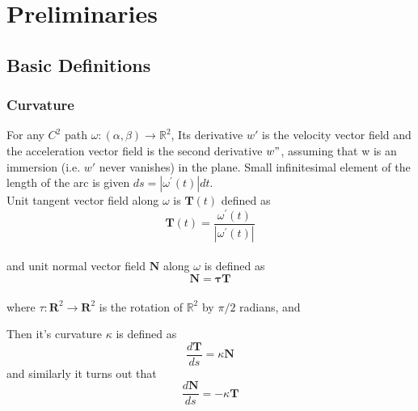 \documentclass[oneside]{book}
\begin{document}
\chapter{Preliminaries }
\label{chap:c2}














 

\section{\textbf{Basic Definitions}}\label{s:1}
\subsection{Curvature}
\label{ss:1}
    
For any $C^{2}$ path $\omega:(\alpha, \beta) \rightarrow \mathbb{R}^{2}$, Its derivative $w'$ is the velocity vector field  and the acceleration vector field is the second derivative  $w"$, assuming that w is an immersion (i.e. $ w' $ never vanishes) in the plane. Small infinitesimal element of the length of the arc is given $d s=\left|\omega^{\prime}(t)\right| d t$.
\\Unit tangent vector field along $\omega$ is $\mathbf{T}(t)$ defined as \\

\begin{equation}
\label{eq1}  
\textbf{{T}}(t)=\frac{\omega^{\prime}(t)}{\left|\omega^{\prime}(t)\right|}
\end{equation}  \\
and unit normal vector field $\mathbf{N}$ along $\omega$ is defined as 
\begin{equation}
\label{eq2}  
     \mathbf{N}=\mathbf{\tau} \mathbf{T}
\end{equation} \\
   where $ \tau: \mathbf{R}^{2} \rightarrow \mathbf{R}^{2}$ is the rotation of $\mathbb{R}^{2}$ by $\pi / 2$ radians, and

  Then it's curvature $\kappa$ is defined as
  \begin{equation}
  \label{eq3}  
    \frac{d \mathbf{T}}{d s}=\kappa \mathbf{N}
\end{equation}  and similarly it turns out that \begin{equation}
\label{eq4}  
    \frac{d \mathbf{N}}{d s}=-\kappa \mathbf{T}
\end{equation}
\end{document}
